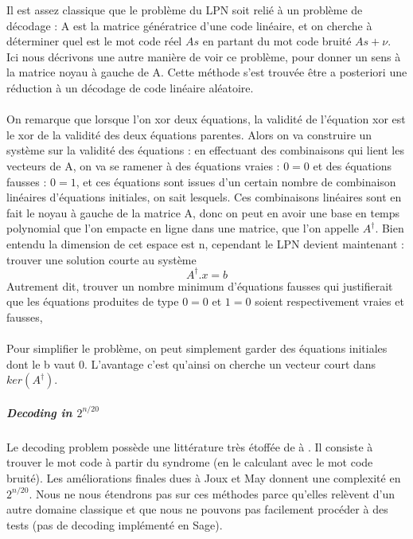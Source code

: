 \documentclass{article}		%
\theoremstyle{definition}
\theoremstyle{plain}
\theoremstyle{plain}
\theoremstyle{plain}
\theoremstyle{plain}
\begin{document}
Il est assez classique que le problème du LPN soit relié à un problème de
décodage : A est la matrice génératrice d'une code linéaire, et on
cherche à déterminer quel est le mot code réel $As$ en partant du mot code
bruité $As+\nu$.
\\
 Ici nous décrivons une autre manière de voir ce
problème, pour donner un sens à la matrice noyau à gauche de A. Cette
méthode s'est trouvée être a posteriori une réduction à un décodage de
code linéaire aléatoire.
\\\\
\label{SVP} 
On remarque que lorsque l'on xor deux équations, la validité de
l'équation xor est le xor de la validité des deux équations parentes.
Alors on va construire un système sur la validité des équations : en
effectuant des combinaisons qui lient les vecteurs de A, on va se ramener
à des équations vraies : $0=0$ et des équations fausses : $0=1$, et ces
équations sont issues d'un certain nombre de combinaison linéaires
d'équations initiales, on sait lesquels. Ces combinaisons linéaires sont en
fait le noyau à gauche de la matrice A, donc on peut en avoir une base en
temps polynomial que l'on empacte en ligne dans une matrice, que l'on
appelle $A^\dagger$. Bien entendu la dimension de cet espace est n,
cependant le LPN devient maintenant : trouver une solution courte au
système  $$A^\dagger.x=b$$ Autrement dit, trouver un nombre minimum
d'équations fausses qui justifierait que les équations produites de type $0=0$ et
$1=0$ soient respectivement vraies et fausses, \\\\
Pour simplifier le problème, on peut simplement garder des équations initiales dont le b vaut 0. 
L'avantage c'est qu'ainsi on cherche un
vecteur court dans $ker(A^\dagger)$. 


\subparagraph{Decoding in $2^{n/20}$} 
Le decoding problem possède une littérature très étoffée de \cite{Stern}
à \cite{Joux}. Il consiste à trouver le mot code à partir du syndrome (en
le calculant avec le mot code bruité). Les améliorations finales dues à
Joux et May donnent une complexité en $2^{n/20}$. Nous ne nous étendrons
pas sur ces méthodes parce qu'elles relèvent d'un autre domaine classique
et que nous ne pouvons pas facilement procéder à des tests (pas de
decoding implémenté en Sage).
\end{document}
